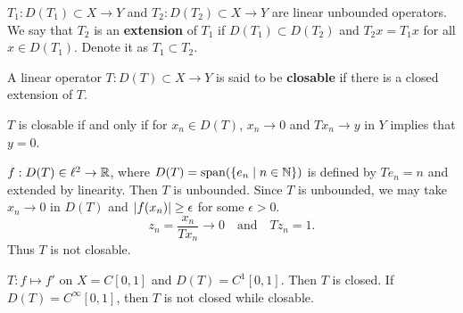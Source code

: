 \begin{definition}
    $T_1:D(T_1)\subset X\to Y$ and $T_2:D(T_2)\subset X\to Y$ are 
    linear unbounded operators. We say that $T_2$ is an \textbf{extension} 
    of $T_1$ if $D(T_1)\subset D(T_2)$ and $T_2x = T_1x$ for all 
    $x\in D(T_1)$. Denote it as $T_1\subset T_2$.
\end{definition}

\begin{definition}
    A linear operator $T:D(T)\subset X\to Y$ is said to be 
    \textbf{closable} if there is a closed extension of $T$. 
\end{definition}
\begin{remark}
    $T$ is closable if and only if for $x_n\in D(T)$, $x_n\to 0$ 
    and $Tx_n\to y$ in $Y$ implies that $y = 0$.
\end{remark}

\begin{example}
    $f:D(T)\in\ell^2\to\mathbb{R}$, where $D(T) = \operatorname{span}(\left\{ e_n \;\middle\vert\; n\in\mathbb{N} \right\})$ 
    is defined by $Te_n = n$ and extended by linearity. Then 
    $T$ is unbounded. Since $T$ is unbounded, we may take 
    $x_n\to 0$ in $D(T)$ and $\left\lvert {f(x_n)} \right\rvert\geq \epsilon$ for some 
    $\epsilon>0$. 
    \begin{equation*}
        z_n = \frac{x_n}{Tx_n}\to 0\quad\text{and}\quad 
        Tz_n = 1.
    \end{equation*}
    Thus $T$ is not closable.
\end{example}

\begin{example}
    $T:f\mapsto f'$ on $X = C[0,1]$ and $D(T) = C^1[0,1]$. 
    Then $T$ is closed. If $D(T) = C^\infty[0,1]$, then $T$ is 
    not closed while closable. 
\end{example}
